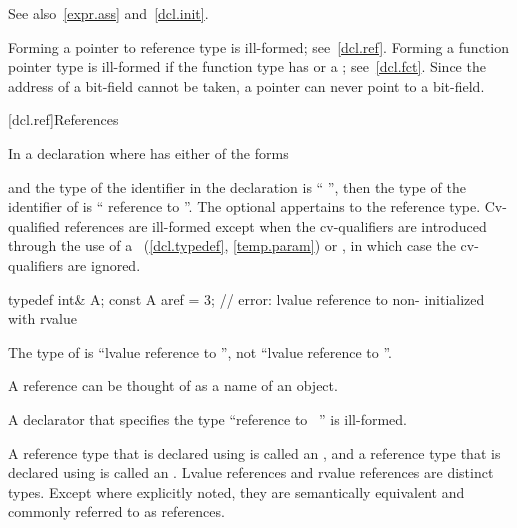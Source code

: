 \pnum
See also~\ref{expr.ass} and~\ref{dcl.init}.

\pnum
\begin{note}
Forming a pointer to reference type is ill-formed; see~\ref{dcl.ref}.
Forming a function pointer type is ill-formed if the function type has
 or a ;
see~\ref{dcl.fct}.
Since the address of a bit-field cannot be taken,
a pointer can never point to a bit-field.
\end{note}

[dcl.ref]{References}%

\pnum
In a declaration
where
has either of the forms
\begin{ncsimplebnf}
\terminal{\&}  \br
\terminal{\&\&}  
\end{ncsimplebnf}
and the type of the identifier in the declaration
is ``
'',
then the type of the identifier of
is `` reference to
''.
The optional  appertains to the reference type.
Cv-qualified references are ill-formed except when the cv-qualifiers
are introduced through the use of a
~(\ref{dcl.typedef}, \ref{temp.param}) or
,
in which case the cv-qualifiers are ignored.
\begin{example}
\begin{codeblock}
typedef int& A;
const A aref = 3;   // error: lvalue reference to non- initialized with rvalue
\end{codeblock}

The type of
is ``lvalue reference to '',
not ``lvalue reference to ''.
\end{example}
\begin{note}
A reference can be thought of as a name of an object.
\end{note}
%
A declarator that specifies the type
``reference to \cv{}~''
is ill-formed.


\pnum
A reference type that is declared using \tcode{\&} is called an
, and a reference type that
is declared using \tcode{\&\&} is called an
. Lvalue references and
rvalue references are distinct types. Except where explicitly noted, they are
semantically equivalent and commonly referred to as references.

